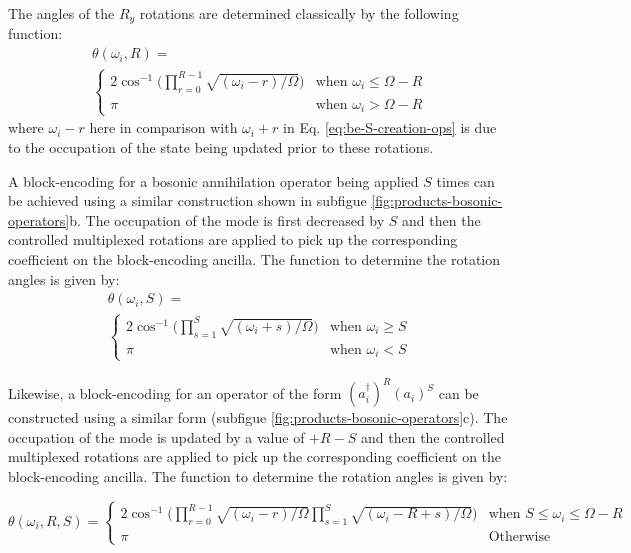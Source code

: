 The angles of the $R_y$ rotations are determined classically by the following function:
\begin{equation}
    \begin{split}
        \theta(\omega_i, R) = \\
        \begin{cases} 
            2\cos^{-1}\Big(\prod_{r=0}^{R-1}\sqrt{(\omega_i - r) / \Omega}\Big) & \text{when } \omega_i \leq \Omega - R \\
            \pi & \text{when } \omega_i > \Omega - R
        \end{cases}
    \end{split}
\end{equation}
where $\omega_i - r$ here in comparison with $\omega_i + r$ in Eq. \ref{eq:be-S-creation-ops} is due to the occupation of the state being updated prior to these rotations.

A block-encoding for a bosonic annihilation operator being applied $S$ times can be achieved using a similar construction shown in subfigue \ref{fig:products-bosonic-operators}b.
The occupation of the mode is first decreased by $S$ and then the controlled multiplexed rotations are applied to pick up the corresponding coefficient on the block-encoding ancilla.
The function to determine the rotation angles is given by:
\begin{equation}
    \begin{split}
        \theta(\omega_i, S) = \\
        \begin{cases} 
            2\cos^{-1}\Big(\prod_{s=1}^{S}\sqrt{(\omega_i + s) / \Omega}\Big) & \text{when } \omega_i \geq S \\
            \pi & \text{when } \omega_i < S
        \end{cases}
    \end{split}
\end{equation}

Likewise, a block-encoding for an operator of the form $(a_i^\dagger)^R (a_i)^S$ can be constructed using a similar form (subfigue \ref{fig:products-bosonic-operators}c).
The occupation of the mode is updated by a value of $+ R - S$ and then the controlled multiplexed rotations are applied to pick up the corresponding coefficient on the block-encoding ancilla.
The function to determine the rotation angles is given by:
\begin{widetext}
\begin{equation}
    \theta(\omega_i, R, S) = 
    \begin{cases} 
        2\cos^{-1}\Big(\prod_{r=0}^{R-1}\sqrt{(\omega_i - r) / \Omega} \prod_{s=1}^{S}\sqrt{(\omega_i - R + s) / \Omega}\Big) & \text{when } S \leq \omega_i \leq \Omega - R \\
        \pi & \text{Otherwise} 
    \end{cases}
\end{equation}
\end{widetext}

